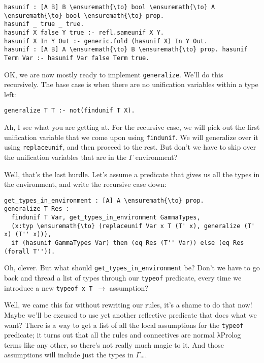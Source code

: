 \begin{verbatim}
hasunif : [A B] B \ensuremath{\to} bool \ensuremath{\to} A \ensuremath{\to} bool \ensuremath{\to} prop.
hasunif _ true _ true.
hasunif X false Y true :- refl.sameunif X Y.
hasunif X In Y Out :- generic.fold (hasunif X) In Y Out.
hasunif : [A B] A \ensuremath{\to} B \ensuremath{\to} prop. hasunif Term Var :- hasunif Var false Term true.
\end{verbatim}

\heroADVISOR{} OK, we are now mostly ready to implement \texttt{generalize}.
We'll do this recursively. The base case is when there are no
unification variables within a type left:

\begin{verbatim}
generalize T T :- not(findunif T X).
\end{verbatim}

\heroSTUDENT{} Ah, I see what you are getting at. For the recursive case, we
will pick out the first unification variable that we come upon using
\texttt{findunif}. We will generalize over it using
\texttt{replaceunif}, and then proceed to the rest. But don't we have to
skip over the unification variables that are in the \(\Gamma\)
environment?

\heroADVISOR{} Well, that's the last hurdle. Let's assume a predicate that
gives us all the types in the environment, and write the recursive case
down:

\begin{verbatim}
get_types_in_environment : [A] A \ensuremath{\to} prop.
generalize T Res :- 
  findunif T Var, get_types_in_environment GammaTypes,
  (x:typ \ensuremath{\to} (replaceunif Var x T (T' x), generalize (T' x) (T'' x))),
  if (hasunif GammaTypes Var) then (eq Res (T'' Var)) else (eq Res (forall T'')).
\end{verbatim}

\heroSTUDENT{} Oh, clever. But what should
\texttt{get\_types\_in\_environment} be? Don't we have to go back and
thread a list of types through our \texttt{typeof} predicate, every time
we introduce a new \texttt{typeof\ x\ T\ \ensuremath{\to}} assumption?

\heroADVISOR{} Well, we came this far without rewriting our rules, it's a
shame to do that now! Maybe we'll be excused to use yet another
reflective predicate that does what we want? There is a way to get a
list of all the local assumptions for the \texttt{typeof} predicate; it
turns out that all the rules and connectives are normal \foreignlanguage{greek}{λ}Prolog terms
like any other, so there's not really much magic to it. And those
assumptions will include just the types in \(\Gamma\)\ldots{}.


